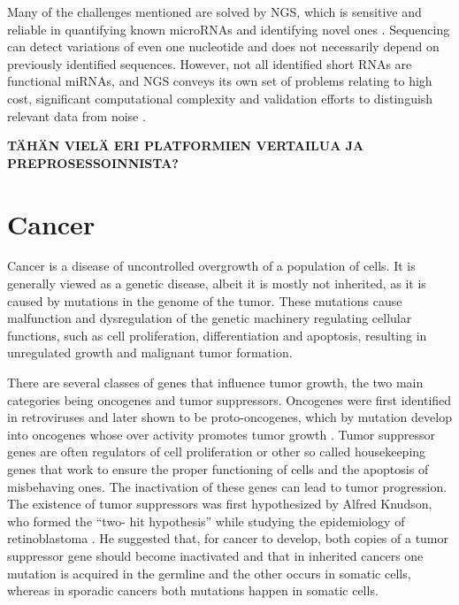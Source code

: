 Many of the challenges mentioned are solved by NGS, which is sensitive and
reliable in quantifying known microRNAs and identifying novel ones
\citep{Huang2011}. Sequencing can detect variations of even one nucleotide and
does not necessarily depend on previously identified sequences. However, not
all identified short RNAs are functional miRNAs, and NGS conveys its own set
of problems relating to high cost, significant computational complexity and
validation efforts to distinguish relevant data from noise
\citep{Chugh2012,Hunt2015}.

\textbf{TÄHÄN VIELÄ ERI PLATFORMIEN VERTAILUA JA PREPROSESSOINNISTA?}















\section{Cancer}\label{cancer}

Cancer is a disease of uncontrolled overgrowth of a population of cells. It is
generally viewed as a genetic disease, albeit it is mostly not inherited, as it is
caused by  mutations in the genome of the tumor. These mutations cause malfunction
and dysregulation of the genetic machinery regulating cellular functions, such
as cell proliferation, differentiation and apoptosis, resulting in
unregulated growth and malignant tumor formation.

There are several classes of genes that influence tumor growth, the two main
categories being oncogenes and tumor suppressors. Oncogenes were first
identified in retroviruses and later shown to be proto-oncogenes, which by
mutation develop into oncogenes whose over activity promotes tumor growth
\citep{Varmus1988}. Tumor suppressor genes are often regulators of cell
proliferation or other so called housekeeping genes that work to ensure the
proper functioning of cells and the apoptosis of misbehaving ones. The
inactivation of these genes can lead to tumor progression. The existence of
tumor suppressors was first hypothesized by Alfred Knudson, who formed the “two-
hit hypothesis” while studying the epidemiology of retinoblastoma
\citep{Knudson1971}. He suggested that, for cancer to develop, both copies of
a tumor suppressor gene should become inactivated and that in inherited
cancers one mutation is acquired in the germline and the other occurs in
somatic cells, whereas in sporadic cancers both mutations happen in somatic
cells.

